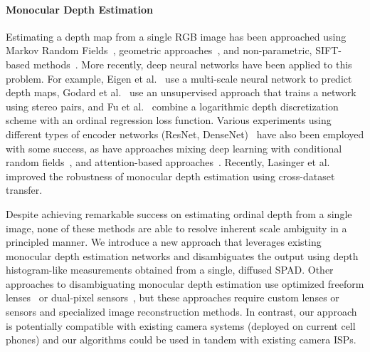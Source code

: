 

\paragraph{Monocular Depth Estimation}
%
Estimating a depth map from a single RGB image has been approached using Markov Random Fields~\cite{Saxena2006}, geometric approaches~\cite{Hoiem2005}, and non-parametric, SIFT-based methods~\cite{Karsch2014}. More recently, deep neural networks have been applied to this problem. For example, Eigen et al.~\cite{Eigen2014} use a multi-scale neural network to
predict depth maps, Godard et al.~\cite{Godard2017} use an unsupervised approach that trains a network using stereo pairs, and Fu et al.~\cite{Fu2018} combine a logarithmic depth discretization scheme with an ordinal regression loss function. Various experiments using different types of encoder networks (\eg ResNet, DenseNet)~\cite{Alhashim2018,Laina2016} have also been employed with some success, as have approaches mixing deep learning with conditional random fields~\cite{Xu2017}, and attention-based approaches~\cite{Hao2018,Xu2018}. Recently, Lasinger et al.~\cite{Lasinger:2019} improved the robustness of monocular depth estimation using cross-dataset transfer.

Despite achieving remarkable success on estimating ordinal depth from a single image, none of these methods are able to resolve inherent scale ambiguity in a principled manner. We introduce a new approach that leverages existing monocular depth estimation networks and disambiguates the output using depth histogram-like measurements obtained from a single, diffused SPAD. Other approaches to disambiguating monocular depth estimation use optimized freeform lenses~\cite{Chang:2019:DeepOptics3D,Wu:2019} or dual-pixel sensors~\cite{Garg:2019}, but these approaches require custom lenses or sensors and specialized image reconstruction methods. In contrast, our approach is potentially compatible with existing camera systems (\eg deployed on current cell phones) and our algorithms could be used in tandem with existing camera ISPs.

